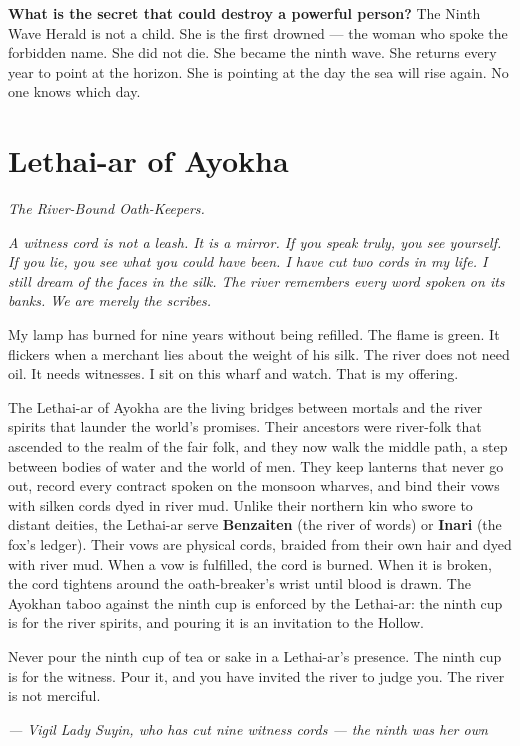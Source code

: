 \begin{almanac}
\textbf{What is the secret that could destroy a powerful person?} The Ninth Wave Herald is not a child. She is the first drowned --- the woman who spoke the forbidden name. She did not die. She became the ninth wave. She returns every year to point at the horizon. She is pointing at the day the sea will rise again. No one knows which day.
\end{almanac}

\newpage

\newpage

\chapter{Lethai-ar of Ayokha}
\label{chap:lethai-ar-ayokha}

\emph{The River-Bound Oath-Keepers.}

\noindent
{\Large
\textit{A witness cord is not a leash. It is a mirror. If you speak truly, you see yourself. If you lie, you see what you could have been. I have cut two cords in my life. I still dream of the faces in the silk. The river remembers every word spoken on its banks. We are merely the scribes.}

\vspace{0.5em}

My lamp has burned for nine years without being refilled. The flame is green. It flickers when a merchant lies about the weight of his silk. The river does not need oil. It needs witnesses. I sit on this wharf and watch. That is my offering.

\vspace{0.5em}

The Lethai-ar of Ayokha are the living bridges between mortals and the river spirits that launder the world's promises. Their ancestors were river-folk that ascended to the realm of the fair folk, and they now walk the middle path, a step between bodies of water and the world of men. They keep lanterns that never go out, record every contract spoken on the monsoon wharves, and bind their vows with silken cords dyed in river mud. Unlike their northern kin who swore to distant deities, the Lethai-ar serve \textbf{Benzaiten} (the river of words) or \textbf{Inari} (the fox's ledger). Their vows are physical cords, braided from their own hair and dyed with river mud. When a vow is fulfilled, the cord is burned. When it is broken, the cord tightens around the oath-breaker's wrist until blood is drawn. The Ayokhan taboo against the ninth cup is enforced by the Lethai-ar: the ninth cup is for the river spirits, and pouring it is an invitation to the Hollow.

\vspace{0.5em}

Never pour the ninth cup of tea or sake in a Lethai-ar's presence. The ninth cup is for the witness. Pour it, and you have invited the river to judge you. The river is not merciful.

\vspace{1em}

\noindent\textit{--- Vigil Lady Suyin, who has cut nine witness cords --- the ninth was her own}
}

